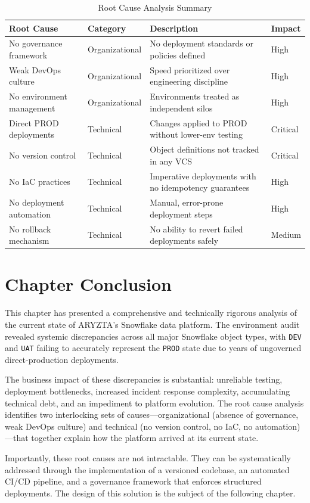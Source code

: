 \begin{table}[H]
  \centering
  \begin{tabularx}{\textwidth}{l l X l}
    \toprule
    \rowcolor{ibmblue!15}
    \textbf{Root Cause} & \textbf{Category} & \textbf{Description} & \textbf{Impact} \\
    \midrule
    No governance framework       & Organizational & No deployment standards or policies defined             & High \\
    Weak DevOps culture           & Organizational & Speed prioritized over engineering discipline           & High \\
    No environment management     & Organizational & Environments treated as independent silos               & High \\
    Direct PROD deployments       & Technical      & Changes applied to PROD without lower-env testing       & Critical \\
    No version control            & Technical      & Object definitions not tracked in any VCS               & Critical \\
    No IaC practices              & Technical      & Imperative deployments with no idempotency guarantees   & High \\
    No deployment automation      & Technical      & Manual, error-prone deployment steps                    & High \\
    No rollback mechanism         & Technical      & No ability to revert failed deployments safely          & Medium \\
    \bottomrule
  \end{tabularx}
  \caption{Root Cause Analysis Summary}
  \label{tab:root-cause}
\end{table}

\section*{Chapter Conclusion}

This chapter has presented a comprehensive and technically rigorous analysis of the current state of ARYZTA's Snowflake data platform. The environment audit revealed systemic discrepancies across all major Snowflake object types, with \texttt{DEV} and \texttt{UAT} failing to accurately represent the \texttt{PROD} state due to years of ungoverned direct-production deployments.

The business impact of these discrepancies is substantial: unreliable testing, deployment bottlenecks, increased incident response complexity, accumulating technical debt, and an impediment to platform evolution. The root cause analysis identifies two interlocking sets of causes---organizational (absence of governance, weak DevOps culture) and technical (no version control, no IaC, no automation)---that together explain how the platform arrived at its current state.

Importantly, these root causes are not intractable. They can be systematically addressed through the implementation of a versioned codebase, an automated CI/CD pipeline, and a governance framework that enforces structured deployments. The design of this solution is the subject of the following chapter.

\newpage
